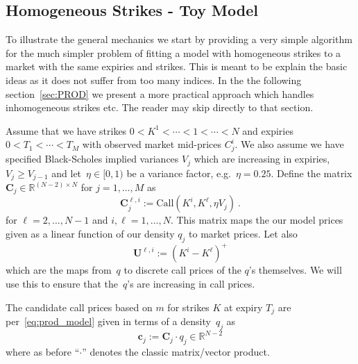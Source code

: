 \documentclass[twoside]{article}
\DeclareRobustCommand{\R}{\mathbb{R}}
\theoremstyle{plain}
\theoremstyle{definition}
\theoremstyle{remark}
\begin{document}
\subsection{Homogeneous Strikes - Toy Model}

 To illustrate the general mechanics we start by providing a very simple algorithm for
the much simpler problem of fitting a model with homogeneous strikes to a market with the same
expiries and strikes. This is meant to be explain the basic ideas as it does not suffer from
too many indices.
In the the following section~\ref{sec:PROD} we present a more practical 
approach which handles inhomogeneous strikes etc. The reader may skip directly to that section.

Assume that we have strikes $0<K^1<\cdots<1<\cdots<N$ and expiries $0<T_1<\cdots<T_M$
with observed market mid-prices $C^i_j$. We also assume we have specified
 Black-Scholes implied variances $V_j$ which are increasing in expiries, $V_j \geq V_{j-1}$ and let~$\eta\in[0,1)$ be a variance factor, e.g.~$\eta=0.25$.
Define the matrix $\mathbf{C}_j\in \R^{ (N-2) \times N}$ for $j=1,\ldots,M$ as
\begin{equation}\label{eq:Cdef}
    \mathbf{C}_j^{\ell,i} := \mathrm{Call}( K^i, K^\ell, \eta V_j ) \ .
\end{equation}
for $\ell=2,\ldots,N-1$ and $i,\ell=1,\ldots,N$. This matrix maps the our model prices given as a linear function of our density $q_j$ to market prices.
Let also
$$
     \mathbf{U}^{\ell,i} := ( K^i - K^\ell )^+ 
$$
which are the maps from~$q$ to discrete call prices of the $q$'s themselves. We will use this to ensure
that the~$q$'s are increasing in call prices.

The candidate call prices based on $m$ for strikes $K$ at expiry $T_j$ are per~\eqref{eq:prod_model} given in terms of a density~$q_j$ as
$$
     \mathbf{c}_j := \mathbf{C}_j \cdot  q_j  \in \R^{N-2} 
$$
where as before ``$\cdot$'' denotes the classic matrix/vector product.
\end{document}
